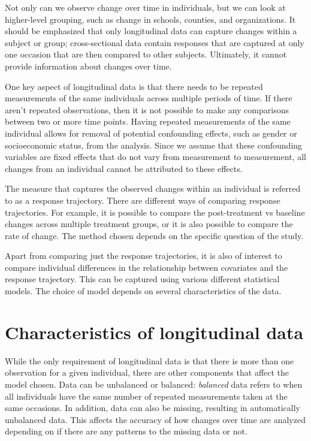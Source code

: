 \documentclass[12pt, twoside]{amherstthesis}
\begin{document}
Not only can we observe change over time in individuals, but we can look at higher-level grouping, such as change in schools, counties, and organizations. It should be emphasized that only longitudinal data can capture changes within a subject or group; cross-sectional data contain responses that are captured at only one occasion that are then compared to other subjects. Ultimately, it cannot provide information about changes over time.

One key aspect of longitudinal data is that there needs to be repeated measurements of the same individuals across multiple periods of time. If there aren't repeated observations, then it is not possible to make any comparisons between two or more time points. Having repeated measurements of the same individual allows for removal of potential confounding effects, such as gender or socioeconomic status, from the analysis. Since we assume that these confounding variables are fixed effects that do not vary from measurement to measurement, all changes from an individual cannot be attributed to these effects.

The measure that captures the observed changes within an individual is referred to as a response trajectory. There are different ways of comparing response trajectories. For example, it is possible to compare the post-treatment vs baseline changes across multiple treatment groups, or it is also possible to compare the rate of change. The method chosen depends on the specific question of the study.

Apart from comparing just the response trajectories, it is also of interest to compare individual differences in the relationship between covariates and the response trajectory. This can be captured using various different statistical models. The choice of model depends on several characteristics of the data.

\hypertarget{characteristics-of-longitudinal-data}{%
\section{Characteristics of longitudinal data}\label{characteristics-of-longitudinal-data}}

While the only requirement of longitudinal data is that there is more than one observation for a given individual, there are other components that affect the model chosen. Data can be unbalanced or balanced: \emph{balanced} data refers to when all individuals have the same number of repeated measurements taken at the same occasions. In addition, data can also be missing, resulting in automatically unbalanced data. This affects the accuracy of how changes over time are analyzed depending on if there are any patterns to the missing data or not.
\end{document}
